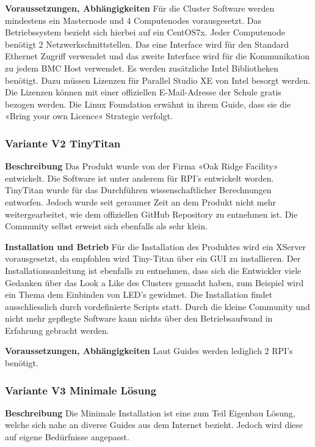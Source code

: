 \textbf{Voraussetzungen, Abhängigkeiten}\newline
Für die Cluster Software werden mindestens ein Masternode und 4 Computenodes vorausgesetzt. Das Betriebssystem bezieht sich hierbei auf ein CentOS7x. Jeder Computenode benötigt 2 Netzwerkschnittstellen. Das eine Interface wird für den Standard Ethernet Zugriff verwendet und das zweite Interface wird für die Kommunikation zu jedem BMC Host verwendet. Es werden zusätzliche Intel Bibliotheken benötigt. Dazu müssen Lizenzen für Parallel Studio XE von Intel besorgt werden. Die Lizenzen können mit einer offiziellen E-Mail-Adresse der Schule gratis bezogen werden. Die Linux Foundation erwähnt in ihrem Guide, dass sie die «Bring your own Licence» Strategie verfolgt.

\subsubsection{Variante V2 \flqq TinyTitan\frqq}
\textbf{Beschreibung}\newline
Das Produkt wurde von der Firma «Oak Ridge Facility» entwickelt. Die Software ist unter anderem für RPI’s entwickelt worden. TinyTitan wurde für das Durchführen wissenschaftlicher Berechnungen entworfen. Jedoch wurde seit geraumer Zeit an dem Produkt nicht mehr weitergearbeitet, wie dem offiziellen GitHub Repository zu entnehmen ist. Die Community selbst erweist sich ebenfalls als sehr klein. 

\textbf{Installation und Betrieb}\newline
Für die Installation des Produktes wird ein XServer vorausgesetzt, da empfohlen wird Tiny-Titan über ein GUI zu installieren. Der Installationsanleitung ist ebenfalls zu entnehmen, dass sich die Entwickler viele Gedanken über das Look a Like des Clusters gemacht haben, zum Beispiel wird ein Thema dem Einbinden von LED’s gewidmet. Die Installation findet ausschliesslich durch vordefinierte Scripts statt. Durch die kleine Community und nicht mehr gepflegte Software kann nichts über den Betriebsaufwand in Erfahrung gebracht werden.

\textbf{Voraussetzungen, Abhängigkeiten}\newline
Laut Guides werden lediglich 2 RPI’s benötigt.

\subsubsection{Variante V3 \flqq Minimale Lösung\frqq}
\textbf{Beschreibung}\newline
Die Minimale Installation ist eine zum Teil Eigenbau Lösung, welche sich nahe an diverse Guides aus dem Internet bezieht. Jedoch wird diese auf eigene Bedürfnisse angepasst.

